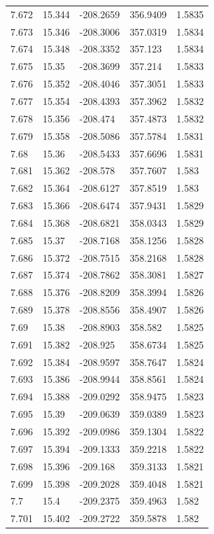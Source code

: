 \begin{tabular}{lllll}
7.672 & 15.344 & -208.2659 & 356.9409 & 1.5835 \\
7.673 & 15.346 & -208.3006 & 357.0319 & 1.5834 \\
7.674 & 15.348 & -208.3352 & 357.123 & 1.5834 \\
7.675 & 15.35 & -208.3699 & 357.214 & 1.5833 \\
7.676 & 15.352 & -208.4046 & 357.3051 & 1.5833 \\
7.677 & 15.354 & -208.4393 & 357.3962 & 1.5832 \\
7.678 & 15.356 & -208.474 & 357.4873 & 1.5832 \\
7.679 & 15.358 & -208.5086 & 357.5784 & 1.5831 \\
7.68 & 15.36 & -208.5433 & 357.6696 & 1.5831 \\
7.681 & 15.362 & -208.578 & 357.7607 & 1.583 \\
7.682 & 15.364 & -208.6127 & 357.8519 & 1.583 \\
7.683 & 15.366 & -208.6474 & 357.9431 & 1.5829 \\
7.684 & 15.368 & -208.6821 & 358.0343 & 1.5829 \\
7.685 & 15.37 & -208.7168 & 358.1256 & 1.5828 \\
7.686 & 15.372 & -208.7515 & 358.2168 & 1.5828 \\
7.687 & 15.374 & -208.7862 & 358.3081 & 1.5827 \\
7.688 & 15.376 & -208.8209 & 358.3994 & 1.5826 \\
7.689 & 15.378 & -208.8556 & 358.4907 & 1.5826 \\
7.69 & 15.38 & -208.8903 & 358.582 & 1.5825 \\
7.691 & 15.382 & -208.925 & 358.6734 & 1.5825 \\
7.692 & 15.384 & -208.9597 & 358.7647 & 1.5824 \\
7.693 & 15.386 & -208.9944 & 358.8561 & 1.5824 \\
7.694 & 15.388 & -209.0292 & 358.9475 & 1.5823 \\
7.695 & 15.39 & -209.0639 & 359.0389 & 1.5823 \\
7.696 & 15.392 & -209.0986 & 359.1304 & 1.5822 \\
7.697 & 15.394 & -209.1333 & 359.2218 & 1.5822 \\
7.698 & 15.396 & -209.168 & 359.3133 & 1.5821 \\
7.699 & 15.398 & -209.2028 & 359.4048 & 1.5821 \\
7.7 & 15.4 & -209.2375 & 359.4963 & 1.582 \\
7.701 & 15.402 & -209.2722 & 359.5878 & 1.582 \\

\end{tabular}
